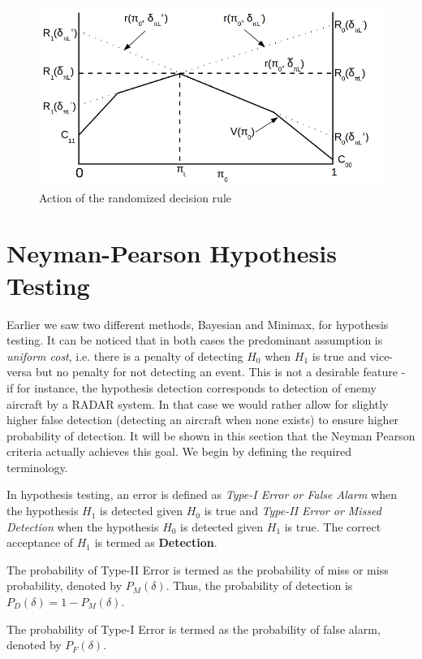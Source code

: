 \documentclass[a4paper,english,12pt]{article}
\begin{document}
\begin{figure}[h]
\centering
\includegraphics[width=0.7\linewidth]{Figures/Lec3_Fig1.jpg}
\caption[rdr]{Action of the randomized decision rule}
\label{fig:AWGN}
\end{figure}
\section{Neyman-Pearson Hypothesis Testing}
Earlier we saw two different methods, Bayesian and Minimax, for hypothesis testing. It can be noticed that in both cases the predominant assumption is \textit{uniform cost}, i.e. there is a penalty of detecting $H_0$ when $H_1$ is true and vice-versa but no penalty for not detecting an event. This is not a desirable feature - if for instance, the hypothesis detection corresponds to detection of enemy aircraft by a RADAR system. In that case we would rather allow for slightly higher false detection (detecting an aircraft when none exists) to ensure higher probability of detection. It will be shown in this section that the Neyman Pearson criteria actually achieves this goal.
We begin by defining the required terminology.
\begin{defn}
In hypothesis testing, an error is defined as \textit{Type-I Error or False Alarm} when the hypothesis $H_1$ is detected given $H_0$ is true and \textit{Type-II Error or Missed Detection} when the hypothesis $H_0$ is detected given $H_1$ is true. The correct acceptance of $H_1$ is termed as \textbf{Detection}. 
\end{defn}
\begin{defn}
The probability of Type-II Error is termed as the probability of miss or miss probability, denoted by $P_M (\delta)$. Thus, the probability of detection is $P_D(\delta) = 1 - P_M(\delta)$. 
\end{defn}
\begin{defn}
The probability of Type-I Error is termed as the probability of false alarm, denoted by $P_F (\delta)$. 
\end{defn}
\end{document}
